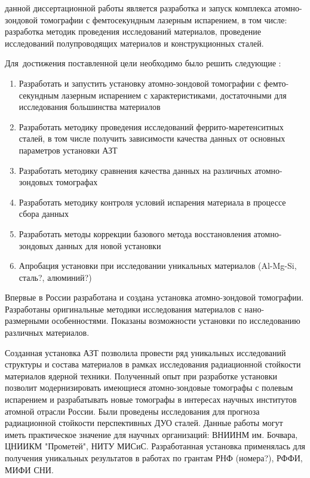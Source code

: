 
{\aim} данной диссертационной работы является разработка и запуск комплекса атомно-зондовой томографии с фемтосекундным лазерным испарением, в том числе: разработка методик проведения исследований материалов, проведение исследований полупроводящих материалов и конструкционных сталей.%

Для~достижения поставленной цели необходимо было решить следующие {\tasks}:
\begin{enumerate}[beginpenalty=10000] %
  \item Разработать и запустить установку атомно-зондовой томографии с фемто-секундным лазерным испарением с характеристиками, достаточными для исследования большинства материалов
  \item Разработать методику проведения исследований феррито-маретенситных сталей, в том числе получить зависимости качества данных от основных параметров установки АЗТ
  \item Разработать методику сравнения качества данных на различных атомно-зондовых томографах
  \item Разработать методику контроля условий испарения материала в процессе сбора данных
  \item Разработать методы коррекции базового метода восстановления атомно-зондовых данных для новой установки 
  \item Апробация установки при исследовании уникальных материалов (Al-Mg-Si, сталь?, алюминий?)
\end{enumerate}


{\novelty}
Впервые в России разработана и создана установка атомно-зондовой томографии. Разработаны оригинальные методики исследования материалов с нано-размерными особенностями. Показаны возможности установки по исследованию различных материалов.

{\influence} Созданная установка АЗТ позволила провести ряд уникальных исследований структуры и состава материалов в рамках исследования радиационной стойкости материалов ядерной техники. Полученный опыт при разработке установки позволит модернизировать имеющиеся атомно-зондовые томографы с полевым испарением и разрабатывать новые томографы в интересах научных институтов атомной отрасли России. Были проведены исследования для прогноза радиационной стойкости перспективных ДУО сталей. Данные работы могут иметь практическое значение для научных организаций: ВНИИНМ им. Бочвара, ЦНИИКМ "Прометей", НИТУ МИСиС. Разработанная установка применялась для получения уникальных результатов в работах по грантам РНФ (номера?), РФФИ, МИФИ СНИ.

